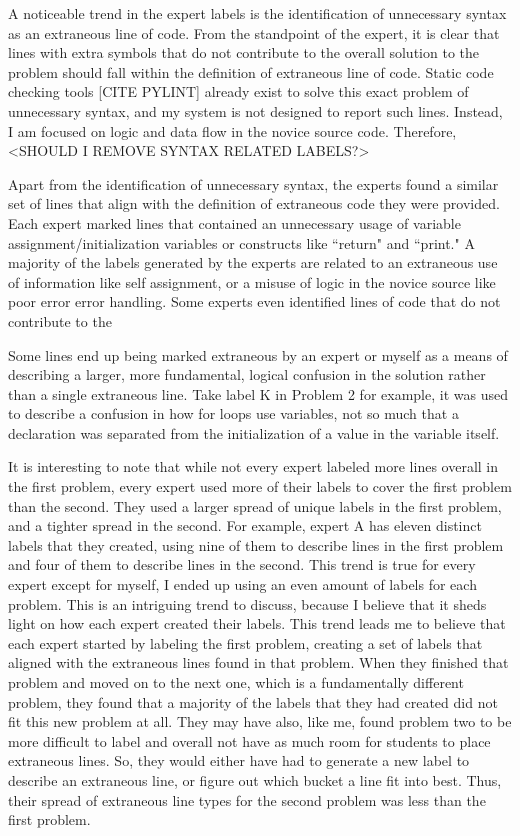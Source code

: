 \documentclass[draft]{article}
\begin{document}
A noticeable trend in the expert labels is the identification of unnecessary syntax as an extraneous line of code. From the standpoint of the expert, it is clear that lines with extra symbols that do not contribute to the overall solution to the problem should fall within the definition of extraneous line of code. Static code checking tools [CITE PYLINT] already exist to solve this exact problem of unnecessary syntax, and my system is not designed to report such lines. Instead, I am focused on logic and data flow in the novice source code. Therefore, <SHOULD I REMOVE SYNTAX RELATED LABELS?>

Apart from the identification of unnecessary syntax, the experts found a similar set of lines that align with the definition of extraneous code they were provided. Each expert marked lines that contained an unnecessary usage of variable assignment/initialization variables or constructs like ``return" and ``print." A majority of the labels generated by the experts are related to an extraneous use of information like self assignment, or a misuse of logic in the novice source like poor error error handling. Some experts even identified lines of code that do not contribute to the 
    
Some lines end up being marked extraneous by an expert or myself as a means of describing a larger, more fundamental, logical confusion in the solution rather than a single extraneous line. Take label K in Problem 2 for example, it was used to describe a confusion in how for loops use variables, not so much that a declaration was separated from the initialization of a value in the variable itself. 

It is interesting to note that while not every expert labeled more lines overall in the first problem, every expert used more of their labels to cover the first problem than the second. They used a larger spread of unique labels in the first problem, and a tighter spread in the second. For example, expert A has eleven distinct labels that they created, using nine of them to describe lines in the first problem and four of them to describe lines in the second. This trend is true for every expert except for myself, I ended up using an even amount of labels for each problem. This is an intriguing trend to discuss, because I believe that it sheds light on how each expert created their labels. This trend leads me to believe that each expert started by labeling the first problem, creating a set of labels that aligned with the extraneous lines found in that problem. When they finished that problem and moved on to the next one, which is a fundamentally different problem, they found that a majority of the labels that they had created did not fit this new problem at all. They may have also, like me, found problem two to be more difficult to label and overall not have as much room for students to place extraneous lines. So, they would either have had to generate a new label to describe an extraneous line, or figure out which bucket a line fit into best. Thus, their spread of extraneous line types for the second problem was less than the first problem. 
\end{document}
